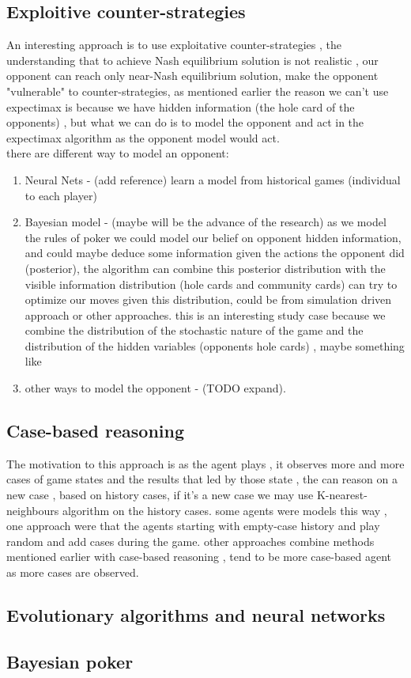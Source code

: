 \documentclass{article}
\begin{document}
\subsection{Exploitive counter-strategies}
An interesting approach is to use exploitative counter-strategies , the understanding that to achieve Nash equilibrium solution is not realistic , our opponent can reach only near-Nash equilibrium solution, make the opponent "vulnerable" to counter-strategies, as mentioned earlier the reason we can't use expectimax is because we have hidden information (the hole card of the opponents) , but what we can do is to model the opponent and act in the expectimax algorithm as the opponent model would act.\\
there are different way to model an opponent: \\
\begin{enumerate}
\item Neural Nets - (add reference) learn a model from historical games (individual to each player) \\
\item Bayesian model - (maybe will be the advance of the research) as we model the rules of poker we could model our belief on opponent hidden information, and could maybe deduce some information given the actions the opponent did (posterior), the algorithm can combine this posterior distribution with the visible information distribution (hole cards and community cards)  can try to optimize our moves given this distribution, could be from simulation driven approach or other approaches. this is an interesting study case because we combine the distribution of the stochastic nature of the game and the distribution of the hidden variables (opponents hole cards) , maybe something like \cite{Seaman2018ProbabilisticPF}\\
\item other ways to model the opponent - (TODO expand).
\end{enumerate}

\subsection{Case-based reasoning}
The motivation to this approach is as the agent plays , it observes more and more cases of game states and the results that led by those state , the can reason on a new case , based on history cases, if it's a new case we may use K-nearest-neighbours algorithm on the history cases. 
some agents were models this way , one approach were that the agents starting with empty-case history and play random and add cases during the game. other approaches combine 
methods mentioned earlier with case-based reasoning , tend to be more case-based agent as more cases are observed. 
\subsection{Evolutionary algorithms and neural networks}

\subsection{Bayesian poker}



\end{document}
